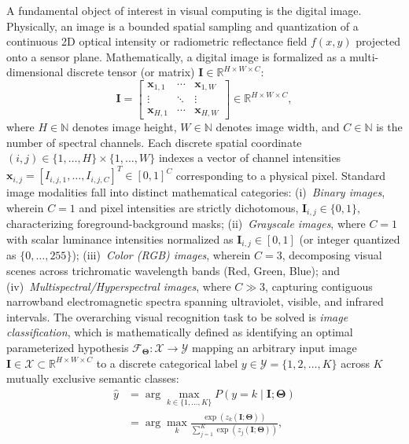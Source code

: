 \documentclass[pdflatex,sn-mathphys-num]{sn-jnl}%
\theoremstyle{thmstyleone}%
\theoremstyle{thmstyletwo}%
\theoremstyle{thmstylethree}%
\begin{document}
A fundamental object of interest in visual computing is the digital image. Physically, an image is a bounded spatial sampling and quantization of a continuous 2D optical intensity or radiometric reflectance field $f(x, y)$ projected onto a sensor plane. Mathematically, a digital image is formalized as a multi-dimensional discrete tensor (or matrix) $\mathbf{I} \in \mathbb{R}^{H \times W \times C}$:
\begin{equation}
\mathbf{I} = \begin{bmatrix}
\mathbf{x}_{1,1} & \cdots & \mathbf{x}_{1,W} \\
\vdots & \ddots & \vdots \\
\mathbf{x}_{H,1} & \cdots & \mathbf{x}_{H,W}
\end{bmatrix} \in \mathbb{R}^{H \times W \times C},
\label{eq:image_tensor_matrix}
\end{equation}
where $H \in \mathbb{N}$ denotes image height, $W \in \mathbb{N}$ denotes image width, and $C \in \mathbb{N}$ is the number of spectral channels. Each discrete spatial coordinate $(i, j) \in \{1, \dots, H\} \times \{1, \dots, W\}$ indexes a vector of channel intensities $\mathbf{x}_{i,j} = [I_{i,j,1}, \dots, I_{i,j,C}]^T \in [0, 1]^C$ corresponding to a physical pixel. Standard image modalities fall into distinct mathematical categories: (i)~\textit{Binary images}, wherein $C=1$ and pixel intensities are strictly dichotomous, $\mathbf{I}_{i,j} \in \{0, 1\}$, characterizing foreground-background masks; (ii)~\textit{Grayscale images}, where $C=1$ with scalar luminance intensities normalized as $\mathbf{I}_{i,j} \in [0, 1]$ (or integer quantized as $\{0, \dots, 255\}$); (iii)~\textit{Color (RGB) images}, wherein $C=3$, decomposing visual scenes across trichromatic wavelength bands (Red, Green, Blue); and (iv)~\textit{Multispectral/Hyperspectral images}, where $C \gg 3$, capturing contiguous narrowband electromagnetic spectra spanning ultraviolet, visible, and infrared intervals. The overarching visual recognition task to be solved is \textit{image classification}, which is mathematically defined as identifying an optimal parameterized hypothesis $\mathcal{F}_{\boldsymbol{\Theta}}: \mathcal{X} \to \mathcal{Y}$ mapping an arbitrary input image $\mathbf{I} \in \mathcal{X} \subset \mathbb{R}^{H \times W \times C}$ to a discrete categorical label $y \in \mathcal{Y} = \{1, 2, \dots, K\}$ across $K$ mutually exclusive semantic classes:
\begin{align}
\hat{y} &= \arg\max_{k \in \{1, \dots, K\}} P(y = k \mid \mathbf{I}; \boldsymbol{\Theta}) \nonumber \\
&= \arg\max_{k} \frac{\exp(z_k(\mathbf{I}; \boldsymbol{\Theta}))}{\sum_{j=1}^K \exp(z_j(\mathbf{I}; \boldsymbol{\Theta}))},
\label{eq:classification_mapping}
\end{align}
\end{document}
